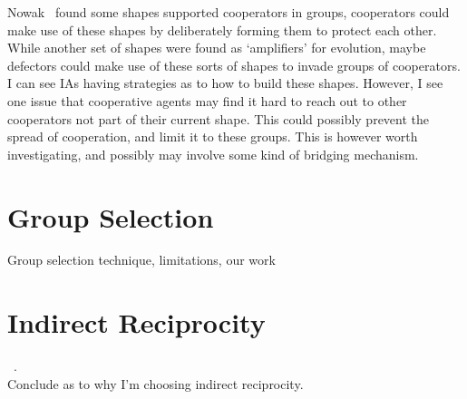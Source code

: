 \documentclass[]{final_report}
\begin{document}
Nowak~\cite{nowak2006evolutionary} found some shapes supported cooperators in groups, cooperators could make use of these shapes by deliberately forming them to protect each other. While another set of shapes were found as `amplifiers' for evolution, maybe defectors could make use of these sorts of shapes to invade groups of cooperators.\\
I can see IAs having strategies as to how to build these shapes. However, I see one issue that cooperative agents may find it hard to reach out to other cooperators not part of their current shape. This could possibly prevent the spread of cooperation, and limit it to these groups. This is however worth investigating, and possibly may involve some kind of bridging mechanism.

\section{Group Selection}
Group selection technique, limitations, our work

\section{Indirect Reciprocity}
~\cite{alexander1987biology}.\\
Conclude as to why I'm choosing indirect reciprocity.
\end{document}
